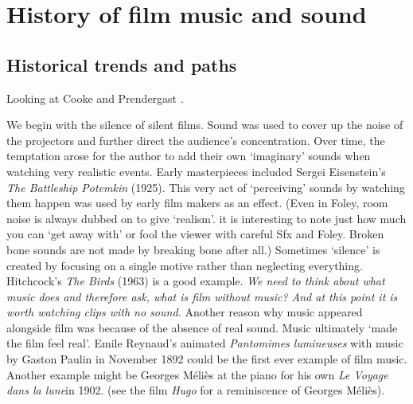 
\chapter{History of film music and sound}
\label{history}

\section{Historical trends and paths}
Looking at Cooke \citeyearpar{cooke2008history} and Prendergast \citeyearpar{prendergast1992film}.

We  begin with the silence of silent films. Sound was used to cover up the noise of the projectors and further direct the audience's concentration. Over time, the temptation arose for the author to add their own `imaginary' sounds when watching very realistic events. Early masterpieces included Sergei Eisenstein's \textit{The Battleship Potemkin} (1925). 
This very act of `perceiving' sounds by watching them happen was used by early film makers as an effect. (Even in Foley, room noise is always dubbed on to give `realism'. it is interesting to note just how much you can `get away with' or fool the viewer with careful Sfx and Foley. Broken bone sounds are not made by breaking bone after all.)
Sometimes `silence' is created by focusing on a single motive rather than neglecting everything. Hitchcock's \textit{The Birds} (1963) is a good example. \textit{We need to think about what music does and therefore ask, what is film without music? And at this point it is worth watching clips with no sound.} Another reason why music appeared alongside film was because of the absence of real sound. Music ultimately `made the film feel real'. Emile Reynaud's animated \textit{Pantomimes lumineuses} with music by Gaston Paulin in November 1892 could be the first ever example of film music. Another example might be Georges M\'eli\`es at the piano for his own \textit{Le Voyage dans la lune}in 1902. (see the film \textit{Hugo} for a reminiscence of Georges M\'eli\`es). 

